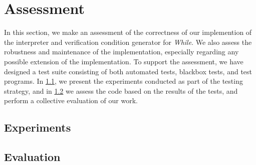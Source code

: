 \section{Assessment}\label{sec:assessment}
In this section, we make an assessment of the correctness of our implemention of the interpreter and verification condition generator for \textit{While}.
We also assess the robustness and maintenance of the implementation, especially regarding any possible extension of the implementation.
To support the assessment, we have designed a test suite consisting of both automated tests, blackbox tests, and test programs.
In \cref{sec:experiments}, we present the experiments conducted as part of the testing strategy, and in \cref{sec:evaluation} we assess the code based on the results of the tests, and perform a collective evaluation of our work.

\subsection{Experiments}\label{sec:experiments}


\subsection{Evaluation}\label{sec:evaluation}

